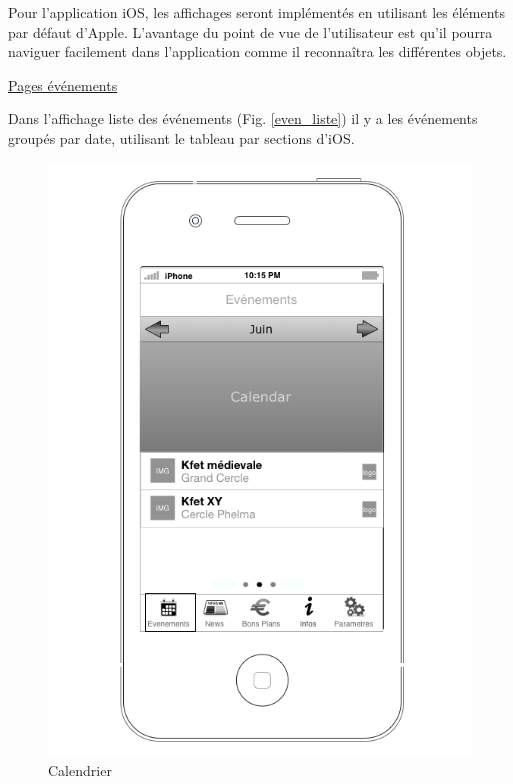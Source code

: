 \documentclass[a4paper, 11px]{article}
\begin{document}
Pour l'application iOS, les affichages seront implémentés en utilisant les éléments par défaut d'Apple. L'avantage du point de vue de l'utilisateur est qu'il pourra naviguer facilement dans l'application comme il reconnaîtra les différentes objets.

\underline{Pages événements}

Dans l'affichage liste des événements (Fig. \ref{even_liste}) il y a les événements groupés par date, utilisant le tableau par sections d'iOS. 


\begin{figure}[htbp]
	\begin{minipage}[c]{.33\linewidth}
		\begin{center}
			\includegraphics[scale=0.3]{../../Sketch/iOS/evenements_calendar.png}
		\end{center}
	\caption{Calendrier}
	\label{calendar}


\end{minipage}
\end{figure}
\end{document}

